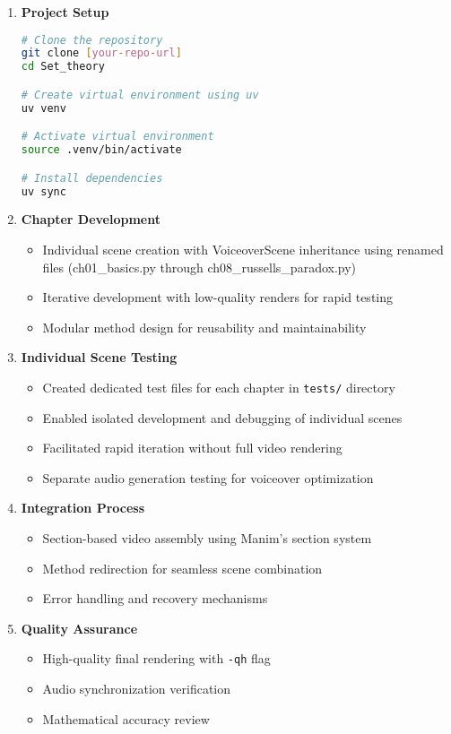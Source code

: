 \documentclass[12pt,a4paper]{article}
\begin{document}
\begin{enumerate}
    \item \textbf{Project Setup}
    \begin{lstlisting}[language=bash]
# Clone the repository
git clone [your-repo-url]
cd Set_theory

# Create virtual environment using uv
uv venv

# Activate virtual environment
source .venv/bin/activate

# Install dependencies
uv sync
    \end{lstlisting}
    
    \item \textbf{Chapter Development}
    \begin{itemize}
        \item Individual scene creation with VoiceoverScene inheritance using renamed files (ch01\_basics.py through ch08\_russells\_paradox.py)
        \item Iterative development with low-quality renders for rapid testing
        \item Modular method design for reusability and maintainability
    \end{itemize}
    
    \item \textbf{Individual Scene Testing}
    \begin{itemize}
        \item Created dedicated test files for each chapter in \texttt{tests/} directory
        \item Enabled isolated development and debugging of individual scenes
        \item Facilitated rapid iteration without full video rendering
        \item Separate audio generation testing for voiceover optimization
    \end{itemize}
    
    \item \textbf{Integration Process}
    \begin{itemize}
        \item Section-based video assembly using Manim's section system
        \item Method redirection for seamless scene combination
        \item Error handling and recovery mechanisms
    \end{itemize}
    
    \item \textbf{Quality Assurance}
    \begin{itemize}
        \item High-quality final rendering with \texttt{-qh} flag
        \item Audio synchronization verification
        \item Mathematical accuracy review
    \end{itemize}
\end{enumerate}
\end{document}
